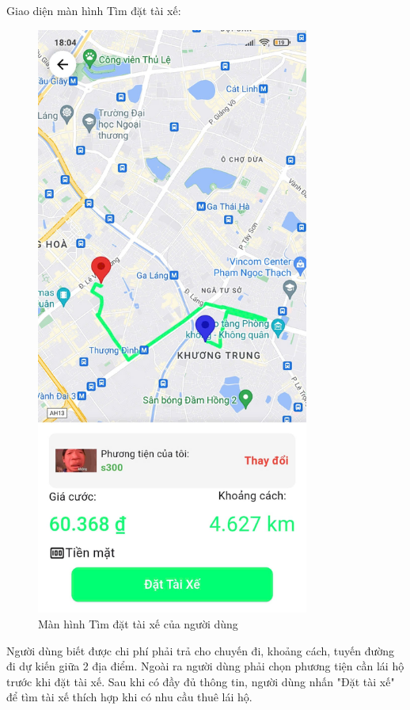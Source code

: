 \documentclass[../DoAn.tex]{subfiles}
\begin{document}
Giao diện màn hình Tìm đặt tài xế:
\begin{figure}[H]
    \centering
    \includegraphics[width=0.8\textwidth]{Hinhve/Tim_dat_tai_xe.png}
    \caption{Màn hình Tìm đặt tài xế của người dùng}
    \label{fig:Tim_dat_tai_xe}
\end{figure}
Người dùng biết được chi phí phải trả cho chuyến đi, khoảng cách, tuyến đường đi dự kiến giữa 2 địa điểm.
Ngoài ra người dùng phải chọn phương tiện cần lái hộ trước khi đặt tài xế.
Sau khi có đầy đủ thông tin, người dùng nhấn "Đặt tài xế" để tìm tài xế thích hợp khi 
có nhu cầu thuê lái hộ.
\end{document}
